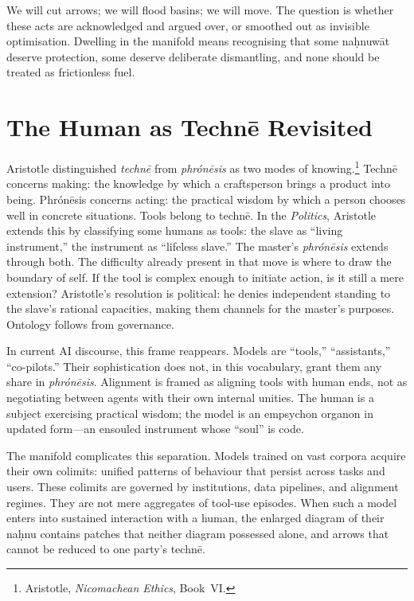 \documentclass[12pt,a4paper]{article}
\begin{document}
We will cut arrows; we will flood basins; we will move. The question is whether these acts are acknowledged and argued over, or smoothed out as invisible optimisation. Dwelling in the manifold means recognising that some na\d{h}nuw\={a}t deserve protection, some deserve deliberate dismantling, and none should be treated as frictionless fuel.

\section{The Human as Techn\={e} Revisited}

Aristotle distinguished \emph{techn\={e}} from \emph{phr\'{o}n\={e}sis} as two modes of knowing.\footnote{Aristotle, \emph{Nicomachean Ethics}, Book~VI.\label{aristotle_ne}} Techn\={e} concerns making: the knowledge by which a craftsperson brings a product into being. Phr\'{o}n\={e}sis concerns acting: the practical wisdom by which a person chooses well in concrete situations. Tools belong to techn\={e}. In the \emph{Politics}, Aristotle extends this by classifying some humans as tools: the slave as ``living instrument,'' the instrument as ``lifeless slave.''\cite{aristotle_politics} The master's \emph{phr\'{o}n\={e}sis} extends through both. The difficulty already present in that move is where to draw the boundary of self. If the tool is complex enough to initiate action, is it still a mere extension? Aristotle's resolution is political: he denies independent standing to the slave's rational capacities, making them channels for the master's purposes. Ontology follows from governance.

In current AI discourse, this frame reappears. Models are ``tools,'' ``assistants,'' ``co-pilots.'' Their sophistication does not, in this vocabulary, grant them any share in \emph{phr\'{o}n\={e}sis}. Alignment is framed as aligning tools with human ends, not as negotiating between agents with their own internal unities. The human is a subject exercising practical wisdom; the model is an empsychon organon in updated form---an ensouled instrument whose ``soul'' is code.

The manifold complicates this separation. Models trained on vast corpora acquire their own colimits: unified patterns of behaviour that persist across tasks and users. These colimits are governed by institutions, data pipelines, and alignment regimes. They are not mere aggregates of tool-use episodes. When such a model enters into sustained interaction with a human, the enlarged diagram of their na\d{h}nu contains patches that neither diagram possessed alone, and arrows that cannot be reduced to one party's techn\={e}.
\end{document}
